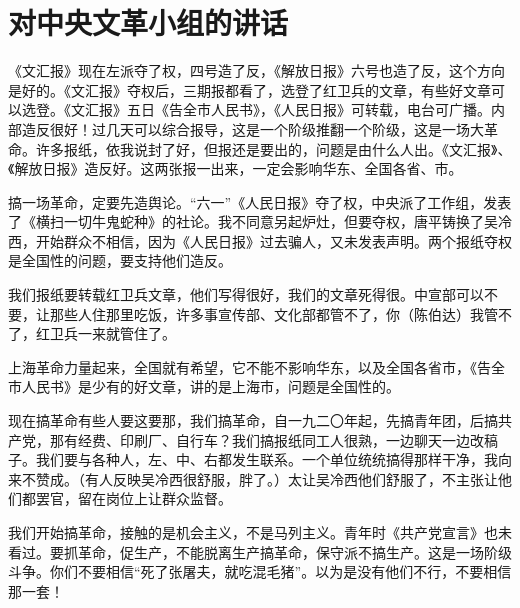 \section[对中央文革小组的讲话（一九六七年一月九日）]{对中央文革小组的讲话}


《文汇报》现在左派夺了权，四号造了反，《解放日报》六号也造了反，这个方向是好的。《文汇报》夺权后，三期报都看了，选登了红卫兵的文章，有些好文章可以选登。《文汇报》五日《告全市人民书》，《人民日报》可转载，电台可广播。内部造反很好！过几天可以综合报导，这是一个阶级推翻一个阶级，这是一场大革命。许多报纸，依我说封了好，但报还是要出的，问题是由什么人出。《文汇报》、《解放日报》造反好。这两张报一出来，一定会影响华东、全国各省、市。

搞一场革命，定要先造舆论。“六一”《人民日报》夺了权，中央派了工作组，发表了《横扫一切牛鬼蛇种》的社论。我不同意另起炉灶，但要夺权，唐平铸换了吴冷西，开始群众不相信，因为《人民日报》过去骗人，又未发表声明。两个报纸夺权是全国性的问题，要支持他们造反。

我们报纸要转载红卫兵文章，他们写得很好，我们的文章死得很。中宣部可以不要，让那些人住那里吃饭，许多事宣传部、文化部都管不了，你（陈伯达）我管不了，红卫兵一来就管住了。

上海革命力量起来，全国就有希望，它不能不影响华东，以及全国各省市，《告全市人民书》是少有的好文章，讲的是上海市，问题是全国性的。

现在搞革命有些人要这要那，我们搞革命，自一九二〇年起，先搞青年团，后搞共产党，那有经费、印刷厂、自行车？我们搞报纸同工人很熟，一边聊天一边改稿子。我们要与各种人，左、中、右都发生联系。一个单位统统搞得那样干净，我向来不赞成。（有人反映吴冷西很舒服，胖了。）太让吴冷西他们舒服了，不主张让他们都罢官，留在岗位上让群众监督。

我们开始搞革命，接触的是机会主义，不是马列主义。青年时《共产党宣言》也未看过。要抓革命，促生产，不能脱离生产搞革命，保守派不搞生产。这是一场阶级斗争。你们不要相信“死了张屠夫，就吃混毛猪”。以为是没有他们不行，不要相信那一套！


